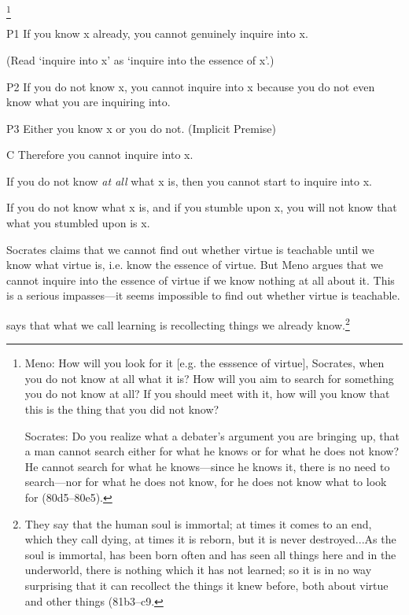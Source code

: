 \documentclass{tufte-handout}
\begin{document}
\footnote[2][+1cm]{\small{Meno: How will you look for it [e.g. the esssence of virtue], Socrates, when you do not know at all what it is? How will you aim to search for something you do not know at all? If you should meet with it, how will you know that this is the thing that you did not know?

Socrates: Do you realize what a debater's argument you are bringing up,  that a man cannot search either for what he knows or for what he does not know? He cannot search for what he knows---since he knows it, there is no need to search---nor for what he does not know, for he does not know what to look for (80d5--80e5).}}
\begin{enumerate*}
\item[P1] If you know x already, you cannot genuinely inquire into x. 
\begin{enumerate*}
\item[] (Read `inquire into x' as `inquire into the essence of x'.) 
\end{enumerate*}
\item[P2] If you do not know x, you cannot inquire into x because you do not even know what you are inquiring into. 
\item[P3] Either you know x or you do not. (Implicit Premise) 
\item[C] Therefore you cannot inquire into x.
\end{enumerate*}

\begin{enumerate*}
\item If you do not know \emph{at all} what x is, then you cannot start to inquire into x. 
\item If you do not know what x is, and if you stumble upon x, you will not know that what you stumbled upon is x. 
\end{enumerate*}
\begin{fullwidth}
 Socrates claims that we cannot find out whether virtue is teachable until we know what virtue is, i.e. know the essence of virtue.  But Meno argues that we cannot inquire into the essence of virtue if we know nothing at all about it. This is a serious impasses---it seems impossible to find out whether virtue is teachable. 
\end{fullwidth}
 says that what we call learning is recollecting things we already know.\footnote{\small{They say that the human soul is immortal; at times it comes to an end, which they call dying, at times it is reborn, but it is never destroyed...As the soul is immortal, has been born often and has seen all things here and in the underworld, there is nothing which it has not learned; so it is in no way surprising that it can recollect the things it knew before, both about virtue and other things (81b3--c9.}} 
\end{document}
